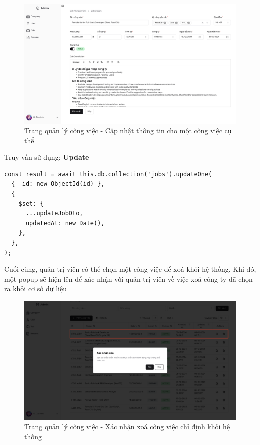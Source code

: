 \begin{figure}[H]
    \centering
    \includegraphics[width=\linewidth]{DBMS-Application/Images/update-job.png}
    \caption{Trang quản lý công việc - Cập nhật thông tin cho một công việc cụ thể}
    \label{fig:enter-label}
\end{figure}

Truy vấn sử dụng: \textbf{Update}

\begin{lstlisting}
const result = await this.db.collection('jobs').updateOne(
  { _id: new ObjectId(id) },
  {
    $set: {
      ...updateJobDto,
      updatedAt: new Date(),
    },
  },
);
\end{lstlisting}

Cuối cùng, quản trị viên có thể chọn một công việc để xoá khỏi hệ thống. Khi đó, một popup sẽ hiện lên để xác nhận với quản trị viên về việc xoá công ty đã chọn ra khỏi cơ sở dữ liệu

\begin{figure}[H]
    \centering
    \includegraphics[width=\linewidth]{DBMS-Application/Images/delete-job.png}
    \caption{Trang quản lý công việc - Xác nhận xoá công việc chỉ định khỏi hệ thống}
    \label{fig:enter-label}
\end{figure}

